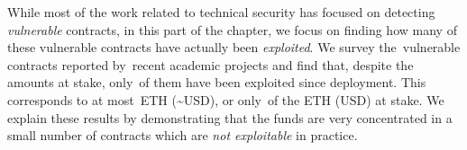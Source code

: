 While most of the work related to technical security has focused on detecting \emph{vulnerable} contracts, in this part of the chapter, we focus on finding how many of these vulnerable contracts have actually been \emph{exploited}.
We survey the~\VulnerableContracts vulnerable contracts reported by~\PapersAnalyzed recent academic projects and find that, despite the amounts at stake, only~\PercentExploitedContracts of them have been exploited since deployment.
This corresponds to at most~\ExploitedEther ETH (\textasciitilde\ExploitedEtherUSD USD\footnotemark), or only~\PercentExploitedEther of the \EtherClaimedVulnerable ETH (\EtherClaimedVulnerableUSD USD) at stake.
We explain these results by demonstrating that the funds are very concentrated in a small number of contracts which are \emph{not exploitable} in practice.

